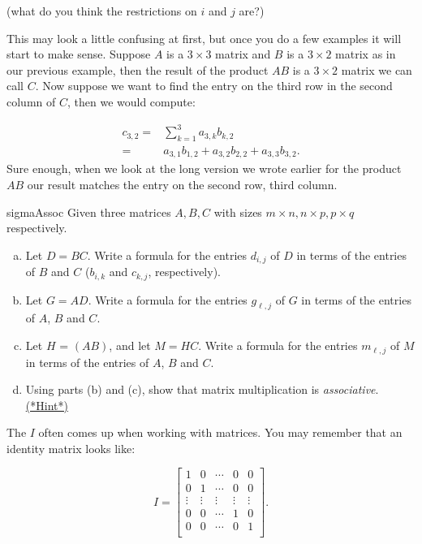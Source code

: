 (what do you think the restrictions on $i$ and $j$ are?)

This may look a little confusing at first, but once you do a few examples it will start to make sense.  Suppose ${A}$ is a $3 \times 3$ matrix and ${B}$ is a $3 \times 2$ matrix as in our previous example, then the result of the product ${A} {B}$ is a $3 \times 2 $ matrix we can call ${C}$.  Now suppose we want to find the entry on the third row in the second column of ${C}$, then we would compute:

\begin{align*}
{c}_{3,2} =& \sum_{k=1}^3 a_{3,k} b_{k,2} \\
=& a_{3,1} b_{1,2} + a_{3,2} b_{2,2} + a_{3,3} b_{3,2}.  
\end{align*}
Sure enough, when we look at the long version we wrote earlier for the product ${AB}$ our result matches the entry on the second row, third column.

\begin{exercise}{sigmaAssoc}
Given three matrices $A, B, C$ with sizes $m \times n, n \times p, p \times q$ respectively.
\begin{enumerate}[(a)]
\item
Let $D = BC$.  Write a formula for the entries $d_{i,j}$ of $D$ in terms of the entries of $B$ and $C$ ($b_{i,k}$ and $c_{k,j}$, respectively). 
\item
Let $G = AD$.  Write a formula for the entries $g_{\ell,j}$ of $G$ in terms of the entries of $A$, $B$ and $C$.
\item
Let $H$ =  $(AB)$, and let $M = HC$. Write a formula for the entries $m_{\ell,j}$ of $M$ in terms of the entries of $A$, $B$ and $C$.
\item
Using parts (b) and (c), show that matrix multiplication is \emph{associative}. 
\hyperref[sec:sigma:hints]{(*Hint*)} 

\end{enumerate}
\end{exercise}

The  $I$ often comes up when working with matrices. You may remember that an identity matrix looks like:

\[I = \left[ \begin{array}{ccccc}
1 & 0  & \cdots & 0 & 0 \\
0 & 1  & \cdots & 0 & 0  \\
\vdots & \vdots & \vdots & \vdots & \vdots\\
0 & 0  & \cdots & 1 & 0  \\
0 & 0  & \cdots & 0 & 1  \\
 \end{array} \right]. \]

